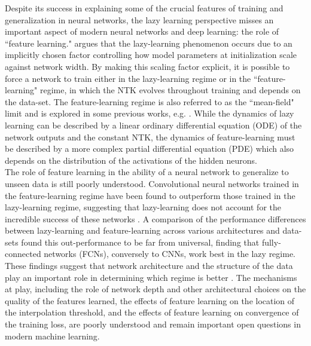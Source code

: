 \documentclass[a4paper, 12pt]{article}
\begin{document}
Despite its success in explaining some of the crucial features of training and generalization in neural networks, the lazy learning perspective misses an important aspect of modern neural networks and deep learning: the role of ``feature learning."  \cite{chizatLazyTrainingDifferentiable2020} argues that the lazy-learning phenomenon occurs due to an implicitly chosen factor controlling how model parameters at initialization scale against network width. By making this scaling factor explicit, it is possible to force a network to train either in the lazy-learning regime or in the ``feature-learning" regime, in which the NTK evolves throughout training and depends on the data-set. The feature-learning regime is also referred to as the ``mean-field" limit and is explored in some previous works, e.g. \cite{meiMeanFieldView2018}. While the dynamics of lazy learning can be described by a linear ordinary differential equation (ODE) of the network outputs and the constant NTK, the dynamics of feature-learning must be described by a more complex partial differential equation (PDE) which also depends on the distribution of the activations of the hidden neurons.\\

 The role of feature learning in the ability of a neural network to generalize to unseen data is still poorly understood. Convolutional neural networks trained in the feature-learning regime have been found to outperform those trained in the lazy-learning regime, suggesting that lazy-learning does not account for the incredible success of these networks \cite{chizatLazyTrainingDifferentiable2020}. A comparison of the performance differences between lazy-learning and feature-learning across various architectures and data-sets found this out-performance to be far from universal, finding that fully-connected networks (FCNs), conversely to CNNs, work best in the lazy regime. These findings suggest that network architecture and the structure of the data play an important role in determining which regime is better \cite{geigerDisentanglingFeatureLazy2020}. The mechanisms at play, including the role of network depth and other architectural choices on the quality of the features learned, the effects of feature learning on the location of the interpolation threshold, and the effects of feature learning on convergence of the training loss, are poorly understood and remain important open questions in modern machine learning.
\end{document}
